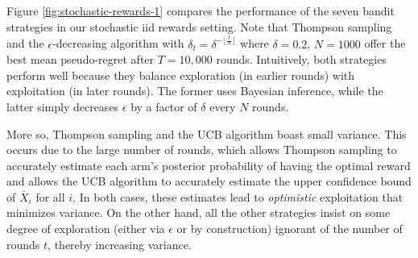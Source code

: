 \documentclass[12pt]{article}
\begin{document}
Figure \ref{fig:stochastic-rewards-1} compares the performance of the seven bandit strategies in our stochastic iid rewards setting. Note that Thompson sampling and the $\epsilon$-decreasing algorithm with $\delta_{t}=\delta^{-\lfloor\frac{t}{N}\rfloor}$ where $\delta=0.2$, $N=1000$ offer the best mean pseudo-regret after $T=10,000$ rounds. Intuitively, both strategies perform well because they balance exploration (in earlier rounds) with exploitation (in later rounds). The former uses Bayesian inference, while the latter simply decreases $\epsilon$ by a factor of $\delta$ every $N$ rounds. 

More so, Thompson sampling and the UCB algorithm boast small variance. This occurs due to the large number of rounds, which allows Thompson sampling to accurately estimate each arm's posterior probability of having the optimal reward and allows the UCB algorithm to accurately estimate the upper confidence bound of $\bar{X}_{i}$ for all $i$. In both cases, these estimates lead to \textit{optimistic} exploitation that minimizes variance. On the other hand, all the other strategies insist on some degree of exploration (either via $\epsilon$ or by construction) ignorant of the number of rounds $t$, thereby increasing variance.
\end{document}
